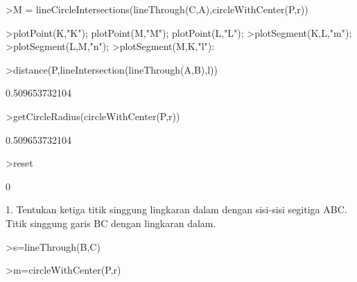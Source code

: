 \documentclass[12pt,Times new roman,letterpaper]{book}
\begin{document}
\begin{eulernootebook}
\begin{eulercomment}
\begin{eulercomment}
\begin{eulernootebook}
\begin{eulercomment}
\begin{eulercomment}
\begin{eulercomment}
\begin{eulercomment}
\begin{eulercomment}
\begin{eulercomment}
\begin{eulernotebook}
\begin{eulercomment}
\begin{eulerprompt}
\end{eulerprompt}
\begin{euleroutput}
  [0.632456,  1.31623]
\end{euleroutput}
\begin{eulerprompt}
>M = lineCircleIntersections(lineThrough(C,A),circleWithCenter(P,r))
\end{eulerprompt}
\begin{euleroutput}
  [1.31623,  0.632456]
\end{euleroutput}
\begin{eulerprompt}
>plotPoint(K,"K"); plotPoint(M,"M"); plotPoint(L,"L");
>plotSegment(K,L,"m");
>plotSegment(L,M,"n");
>plotSegment(M,K,"l"):
\end{eulerprompt}
\begin{eulerprompt}
>distance(P,lineIntersection(lineThrough(A,B),l))
\end{eulerprompt}
\begin{euleroutput}
  0.509653732104
\end{euleroutput}
\begin{eulerprompt}
>getCircleRadius(circleWithCenter(P,r))
\end{eulerprompt}
\begin{euleroutput}
  0.509653732104
\end{euleroutput}
\begin{eulerprompt}
>reset
\end{eulerprompt}
\begin{euleroutput}
  0
\end{euleroutput}
\begin{eulercomment}
1. Tentukan ketiga titik singgung lingkaran dalam dengan sisi-sisi
segitiga ABC.\\
Titik singgung garis BC dengan lingkaran dalam.
\end{eulercomment}
\begin{eulerprompt}
>s=lineThrough(B,C)
\end{eulerprompt}
\begin{euleroutput}
  [-1,  2,  2]
\end{euleroutput}
\begin{eulerprompt}
>m=circleWithCenter(P,r)
\end{eulerprompt}
\begin{euleroutput}
  [0.86038,  0.86038,  0.509654]
\end{euleroutput}
\begin{eulerprompt}

\end{eulerprompt}
\end{eulercomment}
\end{eulernotebook}
\end{eulercomment}
\end{eulercomment}
\end{eulercomment}
\end{eulercomment}
\end{eulercomment}
\end{eulercomment}
\end{eulernootebook}
\end{eulercomment}
\end{eulercomment}
\end{eulernootebook}
\end{document}
